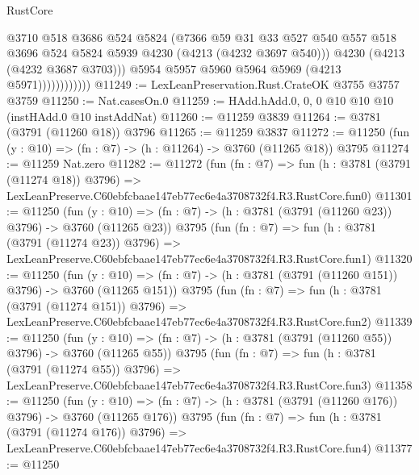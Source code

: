 \begin{lexlean}{RustCore}
\begin{coremodule}
                            @3710
                            @518
                            @3686
                            @524
                            @5824
                            (@7366
                              @59
                              @31
                              @33
                              @527
                              @540
                              @557
                              @518
                              @3696
                              @524
                              @5824
                              @5939
                              @4230
                              (@4213 (@4232 @3697 @540)))
                            @4230
                            (@4213 (@4232 @3687 @3703)))
                          @5954
                          @5957
                          @5960
                          @5964
                          @5969
                          (@4213 @5971))))))))))))
@11249 := LexLeanPreservation.Rust.CrateOK @3755 @3757 @3759
@11250 := Nat.casesOn.{0}
@11259 := HAdd.hAdd.{0, 0, 0} @10 @10 @10 (instHAdd.{0} @10 instAddNat)
@11260 := @11259 @3839
@11264 := @3781 (@3791 (@11260 @18)) @3796
@11265 := @11259 @3837
@11272 := @11250 (fun (y : @10) => (fn : @7) -> (h : @11264) -> @3760 (@11265 @18)) @3795
@11274 := @11259 Nat.zero
@11282 := @11272
    (fun (fn : @7) =>
    fun (h : @3781 (@3791 (@11274 @18)) @3796) =>
    LexLeanPreserve.C60ebfcbaae147eb77ec6e4a3708732f4.R3.RustCore.fun0)
@11301 := @11250
    (fun (y : @10) => (fn : @7) -> (h : @3781 (@3791 (@11260 @23)) @3796) -> @3760 (@11265 @23))
    @3795
    (fun (fn : @7) =>
    fun (h : @3781 (@3791 (@11274 @23)) @3796) =>
    LexLeanPreserve.C60ebfcbaae147eb77ec6e4a3708732f4.R3.RustCore.fun1)
@11320 := @11250
    (fun (y : @10) => (fn : @7) -> (h : @3781 (@3791 (@11260 @151)) @3796) -> @3760 (@11265 @151))
    @3795
    (fun (fn : @7) =>
    fun (h : @3781 (@3791 (@11274 @151)) @3796) =>
    LexLeanPreserve.C60ebfcbaae147eb77ec6e4a3708732f4.R3.RustCore.fun2)
@11339 := @11250
    (fun (y : @10) => (fn : @7) -> (h : @3781 (@3791 (@11260 @55)) @3796) -> @3760 (@11265 @55))
    @3795
    (fun (fn : @7) =>
    fun (h : @3781 (@3791 (@11274 @55)) @3796) =>
    LexLeanPreserve.C60ebfcbaae147eb77ec6e4a3708732f4.R3.RustCore.fun3)
@11358 := @11250
    (fun (y : @10) => (fn : @7) -> (h : @3781 (@3791 (@11260 @176)) @3796) -> @3760 (@11265 @176))
    @3795
    (fun (fn : @7) =>
    fun (h : @3781 (@3791 (@11274 @176)) @3796) =>
    LexLeanPreserve.C60ebfcbaae147eb77ec6e4a3708732f4.R3.RustCore.fun4)
@11377 := @11250

\end{coremodule}
\end{lexlean}
